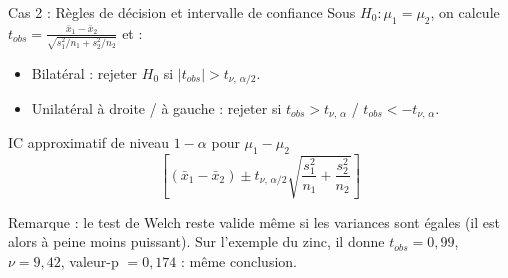 \documentclass{BeamerTemplate}
\begin{document}
\begin{frame}[t]{Cas 2 : Règles de décision et intervalle de confiance}
  Sous $H_0: \mu_1 = \mu_2$, on calcule
  $\displaystyle t_{obs} = \frac{\bar{x}_1 - \bar{x}_2}{\sqrt{s_1^2/n_1 + s_2^2/n_2}}$ et :

  \begin{itemize}\itemsep 1mm
    \item Bilatéral : rejeter $H_0$ si $|t_{obs}| > t_{\nu,\, \alpha/2}$.
    \item Unilatéral à droite / à gauche : rejeter si $t_{obs} > t_{\nu,\, \alpha}$ / $t_{obs} < -t_{\nu,\, \alpha}$.
  \end{itemize}

  \begin{Boite}{IC approximatif de niveau $1-\alpha$ pour $\mu_1 - \mu_2$}
    \[
      \left[ (\bar{x}_1 - \bar{x}_2) \pm t_{\nu,\, \alpha/2} \sqrt{\frac{s_1^2}{n_1} + \frac{s_2^2}{n_2}} \right]
    \]
  \end{Boite}

  \small \alert{Remarque :} le test de Welch reste valide même si les variances sont égales (il est alors à peine moins puissant). Sur l'exemple du zinc, il donne $t_{obs} = 0{,}99$, $\nu = 9{,}42$, valeur-p $= 0{,}174$ : même conclusion.
\end{frame}
\end{document}

